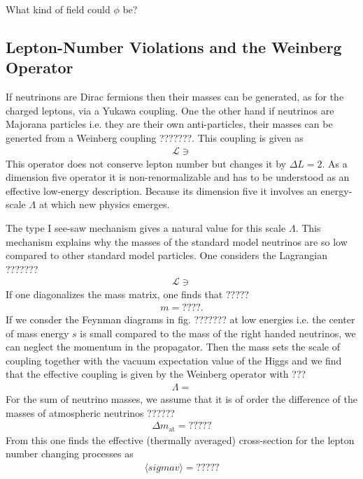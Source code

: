 \documentclass[13pt,a4paper,twoside,titlepage]{article}
\begin{document}
\noindent
What kind of field could $\phi$ be?


\subsection{Lepton-Number Violations and the Weinberg Operator}


\label{sec:lapton_number_violations}


If neutrinons are Dirac fermions then their masses can be generated, as for the charged leptons, via a Yukawa coupling.
One the other hand if neutrinos are Majorana particles i.e. they are their own anti-particles, their masses can be generted from a Weinberg coupling ???????.
This coupling is given as
\begin{align}
    \mathcal{L} \ni
\end{align}
This operator does not conserve lepton number but changes it by $\Delta L = 2$.
As a dimension five operator it is non-renormalizable and has to be understood as
an effective low-energy description.
Because its dimension five it involves an energy-scale $\Lambda$ at which new physics emerges.

The type I see-saw mechanism gives a natural value for this scale $\Lambda$.
This mechanism explains why the masses of the standard model neutrinos are so low compared to other standard model particles.
One considers the Lagrangian ???????
\begin{align}
    \mathcal{L} \ni
\end{align}
If one diagonalizes the mass matrix, one finds that ?????
\begin{align}
    m = ????.
\end{align}
If we consder the Feynman diagrams in fig. ??????? at low energies i.e. the center of mass energy $s$ is small compared to the mass of the right handed neutrinos, we can neglect the momentum in the propagator.
Then the mass sets the scale of coupling together with the vacuum expectation value of the Higgs and we
find that the effective coupling is given by the Weinberg operator with ???
\begin{align}
    \Lambda =
\end{align}
For the sum of neutrino masses, we assume that it is of order the difference of the masses of atmospheric neutrinos ??????
\begin{align}
    \Delta m_\mathrm{at} = ?????
\end{align}
From this one finds the effective (thermally averaged) cross-section for the lepton number changing processes as
\begin{align}
    \langle sigma v \rangle = ?????
\end{align}
\end{document}
